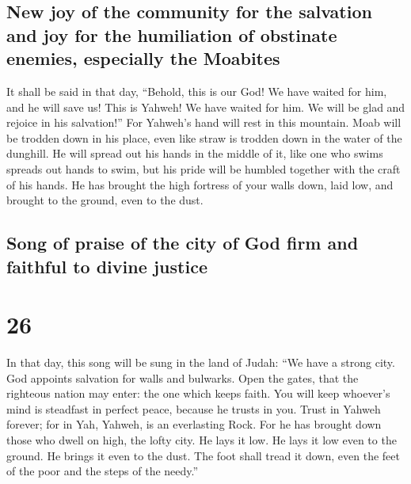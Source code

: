 \hypertarget{new-joy-of-the-community-for-the-salvation-and-joy-for-the-humiliation-of-obstinate-enemies-especially-the-moabites}{%
\subsection{New joy of the community for the salvation and joy for the
humiliation of obstinate enemies, especially the
Moabites}\label{new-joy-of-the-community-for-the-salvation-and-joy-for-the-humiliation-of-obstinate-enemies-especially-the-moabites}}

 It shall be said in that day, ``Behold, this is our God!
We have waited for him, and he will save us! This is Yahweh! We have
waited for him. We will be glad and rejoice in his salvation!''
 For Yahweh's hand will rest in this mountain. Moab will
be trodden down in his place, even like straw is trodden down in the
water of the dunghill.  He will spread out his hands in
the middle of it, like one who swims spreads out hands to swim, but his
pride will be humbled together with the craft of his hands.
 He has brought the high fortress of your walls down,
laid low, and brought to the ground, even to the dust.

\hypertarget{song-of-praise-of-the-city-of-god-firm-and-faithful-to-divine-justice}{%
\subsection{Song of praise of the city of God firm and faithful to
divine
justice}\label{song-of-praise-of-the-city-of-god-firm-and-faithful-to-divine-justice}}

\hypertarget{section-25}{%
\section{26}\label{section-25}}

 In that day, this song will be sung in the land of Judah:
``We have a strong city. God appoints salvation for walls and bulwarks.
 Open the gates, that the righteous nation may enter: the
one which keeps faith.  You will keep whoever's mind is
steadfast in perfect peace, because he trusts in you. 
Trust in Yahweh forever; for in Yah, Yahweh, is an everlasting Rock.
 For he has brought down those who dwell on high, the
lofty city. He lays it low. He lays it low even to the ground. He brings
it even to the dust.  The foot shall tread it down, even
the feet of the poor and the steps of the needy.''

